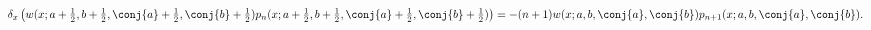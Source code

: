 \[\delta_{x}\left(w(x;a+\tfrac{1}{2},b+\tfrac{1}{2},\conj{a}+\tfrac{1}{2},\conj{%
b}+\tfrac{1}{2})p_{n}(x;a+\tfrac{1}{2},b+\tfrac{1}{2},\conj{a}+\tfrac{1}{2},%
\conj{b}+\tfrac{1}{2})\right)=-(n+1)w(x;a,b,\conj{a},\conj{b})p_{n+1}(x;a,b,%
\conj{a},\conj{b}).\]
